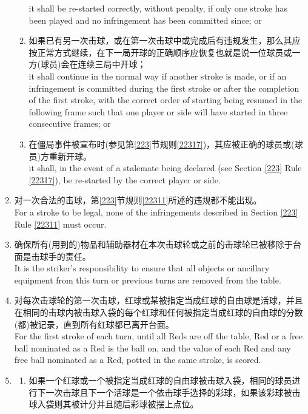 \begin{enumerate}[label=(\alph*)]
\begin{enumerate}[label=(\roman*)]
        it shall be re-started correctly, without penalty, if only one stroke has been played and no infringement has been committed since; or
        \item 如果已有另一次击球，或在第一次击球中或完成后有违规发生，那么其应按正常方式继续，在下一局开球的正确顺序应恢复也就是说一位球员或一方(球员)会在连续三局中开球；\\
        it shall continue in the normal way if another stroke is made, or if an infringement is committed during the first stroke or after the completion of the first stroke, with the correct order of starting being resumed in the following frame such that one player or side will have started in three consecutive frames; or
        \item \label{2233diii}在僵局事件被宣布时(参见第\ref{223}节规则\ref{22317})，其应被正确的球员或(球员)方重新开球。\\
        it shall, in the event of a stalemate being declared (see Section \ref{223} Rule \ref{22317}), be re-started by the correct player or side.
    \end{enumerate}
    \item 对一次合法的击球，第\ref{223}节规则\ref{22311}所述的违规都不能出现。\\
    For a stroke to be legal, none of the infringements described in Section \ref{223} Rule \ref{22311} must occur.
    \item 确保所有(用到的)物品和辅助器材在本次击球轮或之前的击球轮已被移除于台面是击球手的责任。\\
    It is the striker's responsibility to ensure that all objects or ancillary equipment from this turn or previous turns are removed from the table.
    \item 对每次击球轮的第一次击球，红球或某被指定当成红球的自由球是活球，并且在相同的击球内被击球入袋的每个红球和任何被指定当成红球的自由球的分数(都)被记录，直到所有红球都已离开台面。\\
    For the first stroke of each turn, until all Reds are off the table, Red or a free ball nominated as a Red is the ball on, and the value of each Red and any free ball nominated as a Red, potted in the same stroke, is scored.
    \item \label{2233h}
    \begin{enumerate}[label=(\roman*)]
        \item 如果一个红球或一个被指定当成红球的自由球被击球入袋，相同的球员进行下一次击球且下一个活球是一个依击球手选择的彩球，如果该彩球被击球入袋则其被计分并且随后彩球被摆上点位。\\

\end{enumerate}
\end{enumerate}
